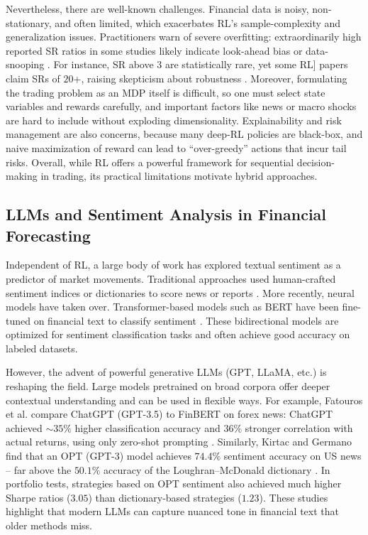 Nevertheless, there are well-known challenges. Financial data is noisy, non-stationary, and often limited, which exacerbates \gls{RL}'s sample-complexity and generalization issues. Practitioners warn of severe overfitting: extraordinarily high reported \gls{SR} ratios in some studies likely indicate look-ahead bias or data-snooping \cite{Nikolaos2025}. For instance, \gls{SR} above \(3\) are statistically rare, yet some \gls{RL}] papers claim \gls{SR}s of \(20\)+, raising skepticism about robustness \cite{Nikolaos2025}. Moreover, formulating the trading problem as an \gls{MDP} itself is difficult, so one must select state variables and rewards carefully, and important factors like news or macro shocks are hard to include without exploding dimensionality. Explainability and risk management are also concerns, because many deep-\gls{RL} policies are black-box, and naive maximization of reward can lead to “over-greedy” actions that incur tail risks. Overall, while \gls{RL} offers a powerful framework for sequential decision-making in trading, its practical limitations motivate hybrid approaches.

\subsection{LLMs and Sentiment Analysis in Financial Forecasting}
Independent of \gls{RL}, a large body of work has explored textual sentiment as a predictor of market movements. Traditional approaches used human-crafted sentiment indices or dictionaries  to score news or reports \cite{Loughran2011}. More recently, neural models have taken over. Transformer-based models such as \gls{BERT} have been fine-tuned on financial text to classify sentiment \cite{Kirtac2024, Fatouros2023}. These bidirectional models are optimized for sentiment classification tasks and often achieve good accuracy on labeled datasets.

However, the advent of powerful generative \gls{LLM}s (GPT, LLaMA, etc.) is reshaping the field. Large models pretrained on broad corpora offer deeper contextual understanding and can be used in flexible ways. For example, Fatouros et al. compare ChatGPT (GPT-3.5) to FinBERT on forex news: ChatGPT achieved \(\sim 35\%\) higher classification accuracy and \(36\%\) stronger correlation with actual returns, using only zero-shot prompting \cite{Fatouros2023}. Similarly, Kirtac and Germano find that an OPT (GPT-3) model achieves \(74.4\%\) sentiment accuracy on US news – far above the \(50.1\%\) accuracy of the Loughran–McDonald dictionary \cite{Kirtac2024}. In portfolio tests, strategies based on OPT sentiment also achieved much higher Sharpe ratios (\(3.05\)) than dictionary-based strategies (\(1.23\)). These studies highlight that modern LLMs can capture nuanced tone in financial text that older methods miss.

